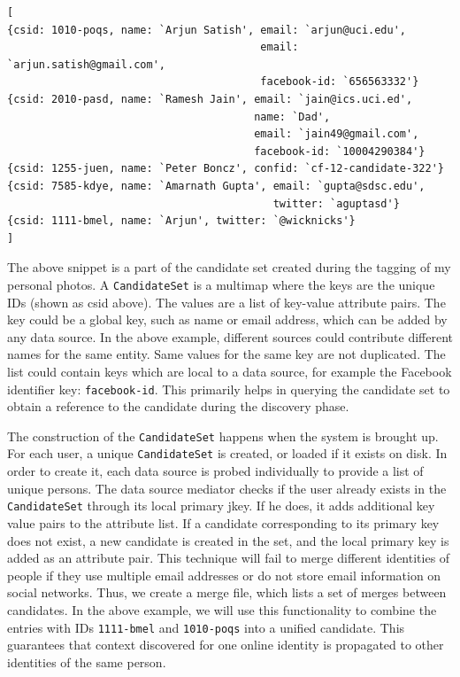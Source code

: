 \begin{verbatim}
[
{csid: 1010-poqs, name: `Arjun Satish', email: `arjun@uci.edu', 
                                        email: `arjun.satish@gmail.com',
                                        facebook-id: `656563332'}
{csid: 2010-pasd, name: `Ramesh Jain', email: `jain@ics.uci.ed',
                                       name: `Dad',
                                       email: `jain49@gmail.com',
                                       facebook-id: `10004290384'}
{csid: 1255-juen, name: `Peter Boncz', confid: `cf-12-candidate-322'}
{csid: 7585-kdye, name: `Amarnath Gupta', email: `gupta@sdsc.edu',
                                          twitter: `aguptasd'}
{csid: 1111-bmel, name: `Arjun', twitter: `@wicknicks'}
]
\end{verbatim}

The above snippet is a part of the candidate set created during the tagging of my personal photos. A \texttt{CandidateSet} is a multimap where the keys are the unique IDs (shown as csid above). The values are a list of key-value attribute pairs. The key could be a global key, such as name or email address, which can be added by any data source. In the above example, different sources could contribute different names for the same entity. Same values for the same key are not duplicated. The list could contain keys which are local to a data source, for example the Facebook identifier key: \texttt{facebook-id}. This primarily helps in querying the candidate set to obtain a reference to the candidate during the discovery phase. 

The construction of the \texttt{CandidateSet} happens when the system is brought up. For each user, a unique \texttt{CandidateSet} is created, or loaded if it exists on disk. In order to create it, each data source is probed individually to provide a list of unique persons. The data source mediator checks if the user already exists in the \texttt{CandidateSet} through its local primary jkey. If he does, it adds additional key value pairs to the attribute list. If a candidate corresponding to its primary key does not exist, a new candidate is created in the set, and the local primary key is added as an attribute pair. This technique will fail to merge different identities of people if they use multiple email addresses or do not store email information on social networks. Thus, we create a merge file, which lists a set of merges between candidates. In the above example, we will use this functionality to combine the entries with IDs \texttt{1111-bmel} and \texttt{1010-poqs} into a unified candidate. This guarantees that context discovered for one online identity is propagated to other identities of the same person.

